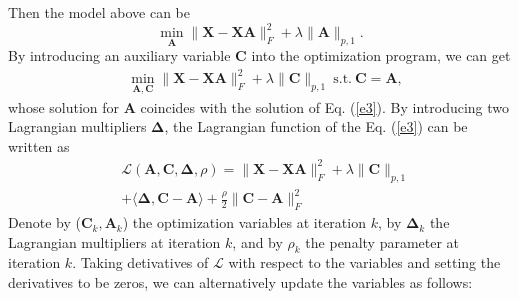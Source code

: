\documentclass[10pt,twocolumn,letterpaper]{article}
\begin{document}
Then the model above can be 
\begin{equation}
\label{e2}
\min_{\bm{A}}
\|
\bm{X}
-
\bm{X}\bm{A}
\|_{F}^{2}
+
\lambda
\|
\bm{A}
\|_{p,1}
.
\end{equation}
By introducing an auxiliary variable $\bm{C}$ into the optimization program, we can get
\begin{equation}
\begin{split}
\label{e3}
&
\min_{\bm{A},\bm{C}}
\|
\bm{X}
-
\bm{X}\bm{A}
\|_{F}^{2}
+
\lambda
\|
\bm{C}
\|_{p,1}
\ 
\text{s.t.}
\ 
\bm{C}=\bm{A}
,
\end{split}
\end{equation}
whose solution for $\bm{A}$ coincides with the solution of Eq. (\ref{e3}). By introducing two Lagrangian multipliers $\bm{\Delta}$, the Lagrangian function of the Eq. (\ref{e3}) can be written as
\begin{equation}
\begin{split}
\label{e5}
&
\mathcal{L}
(\bm{A},\bm{C},\bm{\Delta},\rho)
=
\|
\bm{X}
-
\bm{X}\bm{A}
\|_{F}^{2}
+
\lambda
\|
\bm{C}
\|_{p,1}
\\
&
+
\langle
\bm{\Delta},
\bm{C}-\bm{A}
\rangle
+
\frac{\rho}{2}
\|
\bm{C}-\bm{A}
\|_{F}^{2}
\end{split}
\end{equation}
Denote by ($\bm{C}_{k},\bm{A}_{k}$) the optimization variables at iteration $k$, by $\bm{\Delta}_{k}$ the Lagrangian multipliers at iteration $k$, and by $\rho_{k}$ the penalty parameter at iteration $k$. Taking detivatives of $\mathcal{L}$ with respect to the variables and setting the derivatives to be zeros, we can alternatively update the variables as follows:
\end{document}
